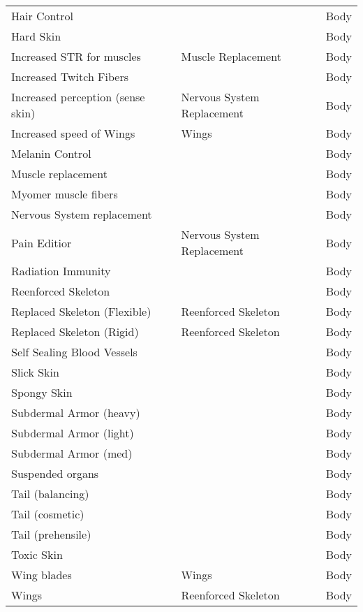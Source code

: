 \documentclass[twoside]{book}
\begin{document}
\begin{longtable}{p{1.25in}p{2em}ll}
      \raggedright Hair Control &&& Body \tabularnewline
      \raggedright Hard Skin &&& Body \tabularnewline
      \raggedright Increased STR for muscles
           && Muscle Replacement
           & Body \tabularnewline
      \raggedright Increased Twitch Fibers
           &&& Body \tabularnewline
      \raggedright Increased perception (sense
           skin) && Nervous System
           Replacement & Body \tabularnewline
      \raggedright Increased speed of Wings
           && Wings & Body \tabularnewline
      \raggedright Melanin Control &&& Body \tabularnewline
      \raggedright Muscle replacement &&& Body \tabularnewline
      \raggedright Myomer muscle fibers &&& Body \tabularnewline
      \raggedright Nervous System replacement
           &&& Body \tabularnewline
      \raggedright Pain Editior && Nervous System
           Replacement & Body \tabularnewline
      \raggedright Radiation Immunity &&& Body \tabularnewline
      \raggedright Reenforced Skeleton &&& Body \tabularnewline
      \raggedright Replaced Skeleton (Flexible)
           && Reenforced Skeleton
           & Body \tabularnewline
      \raggedright Replaced Skeleton (Rigid)
           && Reenforced Skeleton
           & Body \tabularnewline
      \raggedright Self Sealing Blood Vessels
           &&& Body \tabularnewline
      \raggedright Slick Skin &&& Body \tabularnewline
      \raggedright Spongy Skin &&& Body \tabularnewline
      \raggedright Subdermal Armor (heavy)
           &&& Body \tabularnewline
      \raggedright Subdermal Armor (light)
           &&& Body \tabularnewline
      \raggedright Subdermal Armor (med) &&& Body \tabularnewline
      \raggedright Suspended organs &&& Body \tabularnewline
      \raggedright Tail (balancing) &&& Body \tabularnewline
      \raggedright Tail (cosmetic) &&& Body \tabularnewline
      \raggedright Tail (prehensile) &&& Body \tabularnewline
      \raggedright Toxic Skin &&& Body \tabularnewline
      \raggedright Wing blades && Wings & Body \tabularnewline
      \raggedright Wings && Reenforced Skeleton
           & Body \tabularnewline
      
\end{longtable}
    
\end{document}
